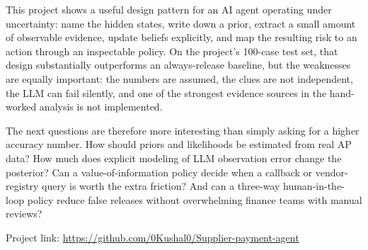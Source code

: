 \documentclass{article}
\begin{document}
This project shows a useful design pattern for an AI agent operating under uncertainty: name the hidden states, write down a prior, extract a small amount of observable evidence, update beliefs explicitly, and map the resulting risk to an action through an inspectable policy. On the project's 100-case test set, that design substantially outperforms an always-release baseline, but the weaknesses are equally important: the numbers are assumed, the clues are not independent, the LLM can fail silently, and one of the strongest evidence sources in the hand-worked analysis is not implemented.

The next questions are therefore more interesting than simply asking for a higher accuracy number. How should priors and likelihoods be estimated from real AP data? How much does explicit modeling of LLM observation error change the posterior? Can a value-of-information policy decide when a callback or vendor-registry query is worth the extra friction? And can a three-way human-in-the-loop policy reduce false releases without overwhelming finance teams with manual reviews?

Project link: \url{https://github.com/0Kushal0/Supplier-payment-agent}



\end{document}
